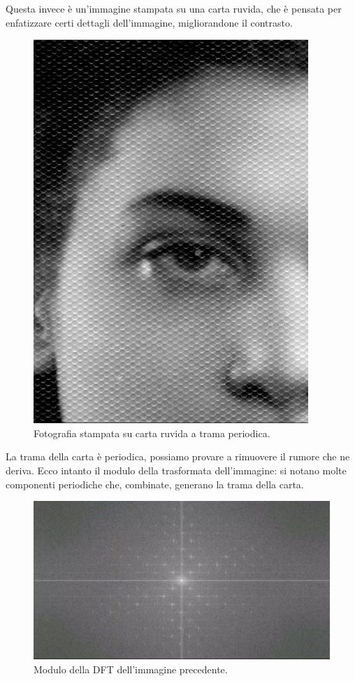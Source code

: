 \documentclass[a4paper,11pt]{article}
\begin{document}
Questa invece è un'immagine stampata su una carta ruvida, che è pensata per enfatizzare certi dettagli dell'immagine, migliorandone il contrasto.

\renewcommand{\thefigure}{8.7}
\begin{figure}[!h]
  \centering
    \includegraphics[scale=0.4]{images/8/photoprint.png}
    \caption{Fotografia stampata su carta ruvida a trama periodica.}
\end{figure}

La trama della carta è periodica, possiamo provare a rimuovere il rumore che ne deriva. Ecco intanto il modulo della trasformata dell'immagine:
si notano molte componenti periodiche che, combinate, generano la trama della carta.

\newpage
\renewcommand{\thefigure}{8.8}
\begin{figure}[!h]
  \centering
    \includegraphics[scale=0.4]{images/8/photoprint_dft.png}
    \caption{Modulo della DFT dell'immagine precedente.}
\end{figure}
\end{document}
